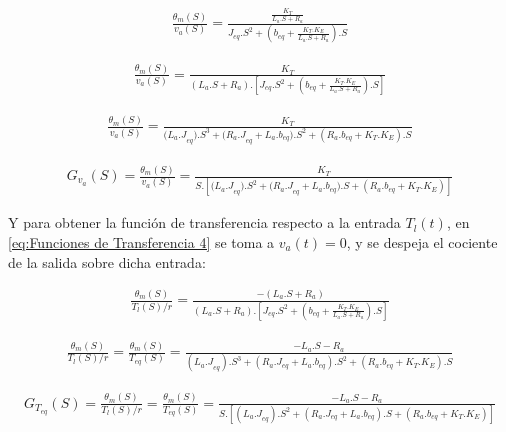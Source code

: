 \documentclass{article}
\begin{document}
\begin{sloppypar}
\begin{align} \label{eq:Funciones de Transferencia 5}
    \frac{\theta_m\left(S\right)}{v_a\left(S\right)}=\frac{\frac{K_T}{L_a.S+R_a}}{J_{eq}.S^2+\left(b_{eq}+\frac{K_T.K_E}{L_a.S+R_a}\right).S}
\end{align}

\begin{align} \label{eq:Funciones de Transferencia 6}
    \frac{\theta_m\left(S\right)}{v_a\left(S\right)}=\frac{K_T}{\left(L_a.S+R_a\right).\left[J_{eq}.S^2+\left(b_{eq}+\frac{K_T.K_E}{L_a.S+R_a}\right).S\right]}
\end{align}

\begin{align} \label{eq:Funciones de Transferencia 7}
    \frac{\theta_m\left(S\right)}{v_a\left(S\right)}=\frac{K_T}{{(L_a.J}_{eq}).S^3+{(R_a.J}_{eq}+L_a.b_{eq}).S^2+\left(R_a.b_{eq}+K_T.K_E\right).S}
\end{align}

\textbf{\begin{align} \label{eq:Funciones de Transferencia G_va(S)}
    G_{v_a}\left(S\right)=\frac{\theta_m\left(S\right)}{v_a\left(S\right)}=\frac{K_T}{S.\left[{(L_a.J}_{eq}).S^2+{(R_a.J}_{eq}+L_a.b_{eq}).S+\left(R_a.b_{eq}+K_T.K_E\right)\right]}
\end{align}}

Y para obtener la función de transferencia respecto a la entrada $T_l(t)$, en \ref{eq:Funciones de Transferencia 4} se toma a $v_a(t)=0$, y se despeja el cociente de la salida sobre dicha entrada:


\begin{align} \label{eq:Funciones de Transferencia 9}
    \frac{\theta_m\left(S\right)}{T_l\left(S\right)/r}=\frac{-\left(L_a.S+R_a\right)}{\left(L_a.S+R_a\right).\left[J_{eq}.S^2+\left(b_{eq}+\frac{K_T.K_E}{L_a.S+R_a}\right).S\right]}
\end{align}


\begin{align} \label{eq:Funciones de Transferencia 10}
    \frac{\theta_m\left(S\right)}{T_l\left(S\right)/r}=\frac{\theta_m\left(S\right)}{T_{eq}\left(S\right)}=\frac{-L_a.S-R_a}{\left({L_a.J}_{eq}\right).S^3+\left(R_a.J_{eq}+L_a.b_{eq}\right).S^2+\left(R_a.b_{eq}+K_T.K_E\right).S}
\end{align}


\textbf{\begin{align} \label{eq:Funciones de Transferencia G_Teq(S)}
    G_{T_{eq}}\left(S\right)=\frac{\theta_m\left(S\right)}{T_l\left(S\right)/r}=\frac{\theta_m\left(S\right)}{T_{eq}\left(S\right)}=\frac{-L_a.S-R_a}{S.\left[\left({L_a.J}_{eq}\right).S^2+\left(R_a.J_{eq}+L_a.b_{eq}\right).S+\left(R_a.b_{eq}+K_T.K_E\right)\right]}
\end{align}}


\end{sloppypar}
\end{document}

